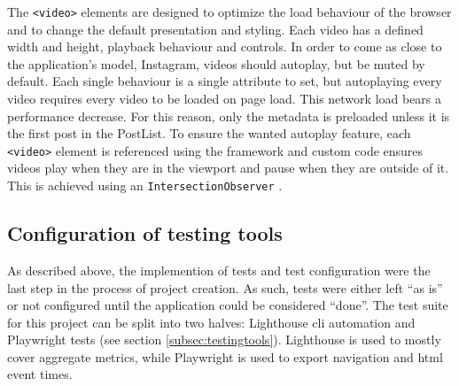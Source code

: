 \documentclass[a4paper, 12pt]{article}
\begin{document}
The \verb|<video>| elements are designed to optimize the load behaviour of the browser and to change the default presentation and styling.
Each video has a defined width and height, playback behaviour and controls.
In order to come as close to the application's model, Instagram, videos should autoplay, but be muted by default.
Each single behaviour is a single attribute to set, but autoplaying every video requires every video to be loaded on page load.
This network load bears a performance decrease.
For this reason, only the metadata is preloaded unless it is the first post in the PostList.
To ensure the wanted autoplay feature, each \verb|<video>| element is referenced using the framework and custom code ensures videos play when they are in the viewport and pause when they are outside of it.
This is achieved using an \verb|IntersectionObserver| \citep{IntersectionObserver}.

\subsection{Configuration of testing tools}\label{subsec:tests}
% 

As described above, the implemention of tests and test configuration were the last step in the process of project creation.
As such, tests were either left \enquote{as is} or not configured until the application could be considered \enquote{done}.
The test suite for this project can be split into two halves: Lighthouse \acrshort{cli} automation and Playwright tests (see section \ref{subsec:testingtools}).
Lighthouse is used to mostly cover aggregate metrics, while Playwright is used to export navigation and \acrshort{html} event times.
\end{document}

